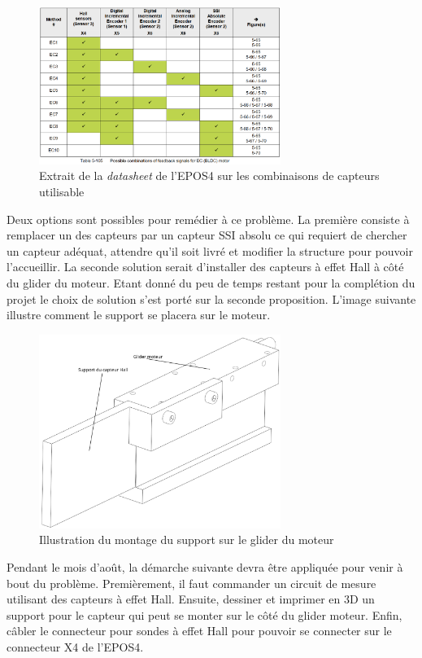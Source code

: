 \begin{figure}[H]
    \centering
    \includegraphics[width = 0.7\textwidth]{assets/figures/TableauCapteur.png}
    \caption{Extrait de la \textit{datasheet} de l'EPOS4 sur les combinaisons de capteurs utilisable}
    \label{fig:TableauCapteur}
\end{figure}

Deux options sont possibles pour remédier à ce problème. La première consiste à remplacer un des capteurs par un capteur SSI absolu ce qui
requiert de chercher un capteur adéquat, attendre qu'il soit livré et modifier la structure pour pouvoir l'accueillir. La seconde solution
serait d'installer des capteurs à effet Hall à côté du glider du moteur. Etant donné du peu de temps restant pour la complétion du projet le
choix de solution s'est porté sur la seconde proposition. L'image suivante illustre comment le support se placera sur le moteur.\\

\begin{figure}[H]
    \centering
    \includegraphics[width = 0.7\textwidth]{assets/figures/SolCapt.svg}
    \caption{Illustration du montage du support sur le glider du moteur}
    \label{fig:SolCapt}
\end{figure}

Pendant le mois d'août, la démarche suivante devra être appliquée pour venir à bout du problème. Premièrement, il faut commander un circuit de
mesure utilisant des capteurs à effet Hall. Ensuite, dessiner et imprimer en 3D un support pour le capteur qui peut se monter sur le côté du
glider moteur. Enfin, câbler le connecteur pour sondes à effet Hall pour pouvoir se connecter sur le connecteur X4 de l'EPOS4.